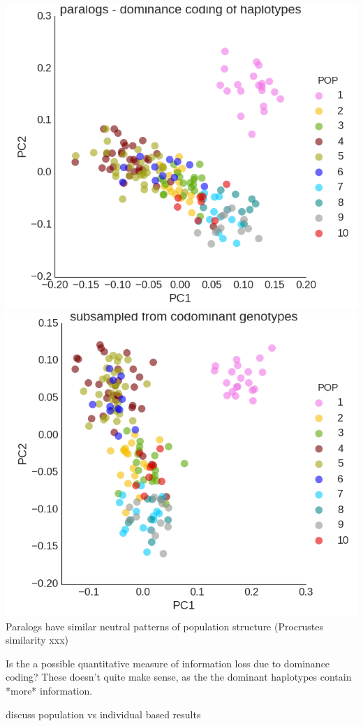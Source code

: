 \documentclass[12pt,  one column]{article}
\begin{document}
\includegraphics[scale=.3]{figures/PCA_dom_paralogs.png}
\includegraphics[scale=.3]{figures/PCA_codom_subsample.png}
Paralogs have similar neutral patterns of population structure (Procrustes similarity xxx)

Is the a possible quantitative measure of information loss due to dominance coding?  These doesn't quite make sense, as the the dominant haplotypes contain *more* information.

discuss population vs individual based results
\end{document}
